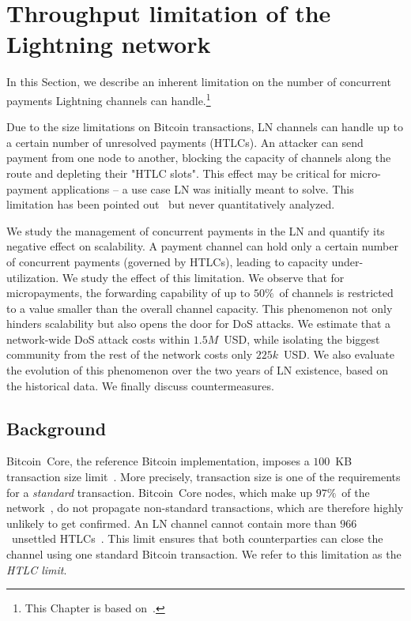 \chapter{Throughput limitation of the Lightning network}

\label{Chapter08HTLClimit}

In this Section, we describe an inherent limitation on the number of concurrent payments Lightning channels can handle.\footnote{This Chapter is based on~\cite{Tikhomirov2020a}.}

Due to the size limitations on Bitcoin transactions, LN channels can handle up to a certain number of unresolved payments (HTLCs).
An attacker can send payment from one node to another, blocking the capacity of channels along the route and depleting their "HTLC slots".
This effect may be critical for micro-payment applications -- a use case LN was initially meant to solve.
This limitation has been pointed out~\cite{EmelyanenkoK2017} but never quantitatively analyzed.

We study the management of concurrent payments in the LN and quantify its negative effect on scalability.
A payment channel can hold only a certain number of concurrent payments (governed by HTLCs), leading to capacity under-utilization.
We study the effect of this limitation.
We observe that for micropayments, the forwarding capability of up to $50\%$~of channels is restricted to a value smaller than the overall channel capacity.
This phenomenon not only hinders scalability but also opens the door for DoS attacks.
We estimate that a network-wide DoS attack costs within $1.5M$~USD, while isolating the biggest community from the rest of the network costs only $225k$~USD\@.
We also evaluate the evolution of this phenomenon over the two years of LN existence, based on the historical data.
We finally discuss countermeasures.


\section{Background} \label{max-htlc-background}

Bitcoin~Core, the reference Bitcoin implementation, imposes a $100$~KB transaction size limit~\cite{StandardTxBitcoinSE, BitcoinCoreMaxTxWeight}.
More precisely, transaction size is one of the requirements for a \textit{standard} transaction.
Bitcoin~Core nodes, which make up $97\%$~of the network~\cite{CoinDance}, do not propagate non-standard transactions, which are therefore highly unlikely to get confirmed.
An LN channel cannot contain more than $966$~unsettled HTLCs~\cite{BOLT2Rationale}.
This limit ensures that both counterparties can close the channel using one standard Bitcoin transaction.
We refer to this limitation as the \textit{HTLC limit}.

